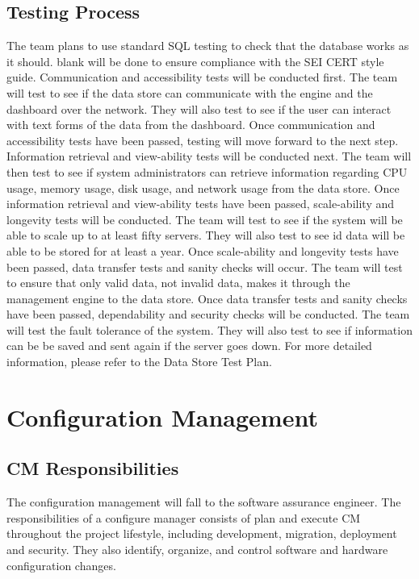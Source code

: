 \documentclass[letterpaper,12pt,oneside,listof=totoc]{scrreprt}
\begin{document}
\section{Testing Process}
The team plans to use standard SQL testing to check that the database works as it should.
blank will be done to ensure compliance with the SEI CERT style guide.
Communication and accessibility tests will be conducted first. The team will test to see if the data store can communicate with the engine and the dashboard over the network. They will also test to see if the user can interact with text forms of the data from the dashboard. Once communication and accessibility tests have been passed, testing will move forward to the next step. Information retrieval and view-ability tests will be conducted next. The team will then test to see if system administrators can retrieve information regarding CPU usage, memory usage, disk usage, and network usage from the data store. Once information retrieval and view-ability tests have been passed, scale-ability and longevity tests will be conducted. The team will test to see if the system will be able to scale up to at least fifty servers. They will also test to see id data will be able to be stored for at least a year. Once scale-ability and longevity tests have been passed, data transfer tests and sanity checks will occur. The team will test to ensure that only valid data, not invalid data, makes it through the management engine to the data store. Once data transfer tests and sanity checks have been passed, dependability and security checks will be conducted. The team will test the fault tolerance of the system. They will also test to see if information can be be saved and sent again if the server goes down. For more detailed information, please refer to the Data Store Test Plan. 


\chapter{Configuration Management}

\section{CM Responsibilities}
The configuration management will fall to the software assurance engineer. The responsibilities of a configure manager consists of plan and execute CM throughout the project lifestyle, including development, migration, deployment and security. They also identify, organize, and control software and hardware configuration changes.
\end{document}
